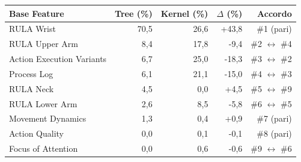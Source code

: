 \begin{tabular*}{\linewidth}{@{}l@{\extracolsep{\fill}}rrrr@{}}
\toprule
\textbf{Base Feature} & \textbf{Tree (\%)} & \textbf{Kernel (\%)} & \textbf{$\Delta$ (\%)} & \textbf{Accordo} \\
\midrule
RULA Wrist & 70{,}5 & 26{,}6 & +43{,}8 & \#1 (pari) \\
RULA Upper Arm & 8{,}4 & 17{,}8 & -9{,}4 & \#2 $\leftrightarrow$ \#4 \\
Action Execution Variants & 6{,}7 & 25{,}0 & -18{,}3 & \#3 $\leftrightarrow$ \#2 \\
Process Log & 6{,}1 & 21{,}1 & -15{,}0 & \#4 $\leftrightarrow$ \#3 \\
RULA Neck & 4{,}5 & 0{,}0 & +4{,}5 & \#5 $\leftrightarrow$ \#9 \\
RULA Lower Arm & 2{,}6 & 8{,}5 & -5{,}8 & \#6 $\leftrightarrow$ \#5 \\
Movement Dynamics & 1{,}3 & 0{,}4 & +0{,}9 & \#7 (pari) \\
Action Quality & 0{,}0 & 0{,}1 & -0{,}1 & \#8 (pari) \\
Focus of Attention & 0{,}0 & 0{,}6 & -0{,}6 & \#9 $\leftrightarrow$ \#6 \\
\bottomrule
\end{tabular*}

